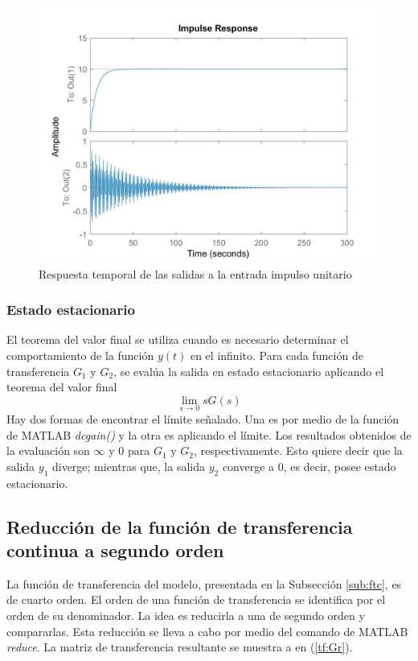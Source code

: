 \documentclass[journal]{IEEEtran}
\begin{document}
\begin{figure}[ht!]
\caption{Respuesta temporal de las salidas a la entrada impulso unitario\label{fig:impulse}}
  \centering
\includegraphics[scale=0.18]{tf/impulse.jpg}
\end{figure}

\subsubsection*{Estado estacionario}
El teorema del valor final se utiliza cuando es necesario determinar el comportamiento de la función $y(t)$ en el infinito. Para cada función de transferencia $G_1$ y $G_2$, se evalúa la salida en estado estacionario aplicando el teorema del valor final
\[
\lim_{s \to 0} sG(s)
\]
Hay dos formas de encontrar el límite señalado. Una es por medio de la función de MATLAB \textit{dcgain()} y la otra es aplicando el límite.
Los resultados obtenidos de la evaluación son $\infty$ y 0 para $G_1$ y $G_2$, respectivamente. Esto quiere decir que la salida $y_1$ diverge; mientras que, la salida $y_2$ converge a 0, es decir, posee estado estacionario. 

\subsection{Reducción de la función de transferencia continua a segundo orden}
La función de transferencia del modelo, presentada en la Subsección \ref{sub:ftc}, es de cuarto orden. El orden de una función de transferencia se identifica por el orden de su denominador. La idea es reducirla a una de segundo orden y compararlas. Esta reducción se lleva a cabo por medio del comando de MATLAB \textit{reduce}. La matriz de transferencia resultante se muestra a en (\ref{tf:Gr}).\\ 
\end{document}
